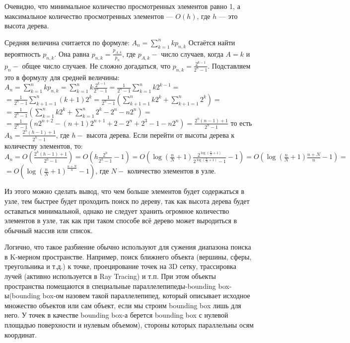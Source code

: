 \documentclass[a4paper, 12pt]{article}
\begin{document}
	Очевидно, что минимальное количество просмотренных элементов равно 1, а максимальное количество просмотренных элементов — $O(h)$, где $h$ — это высота дерева.

	Средняя величина считается по формуле: $A_{n}=\sum_{k=1}^{n} k p_{n, k}$
	Остаётся найти вероятность $p_{n, k}$. Она равна $p_{n, k}=\frac{p_{A, k}}{p_{n}}$, где $p_{A, k}-$ число случаев, когда $A=k$ и $p_{n}-$ общее число случаев. Не сложно догадаться, что $p_{n, k}=\frac{2^{k-1}}{2^{n}-1}$.
	Подставляем это в формулу для средней величины:
	$A_{n}=\sum_{k=1}^{n} k p_{n, k}=\sum_{k=1}^{n} k \frac{2^{k-1}}{2^{n}-1}=\frac{1}{2^{n}-1} \sum_{k=1}^{n} k 2^{k-1}=$
	$=\frac{1}{2^{n}-1} \sum_{k+1=1}^{n}(k+1) 2^{k}=\frac{1}{2^{n}-1}\left(\sum_{k+1=1}^{n} k 2^{k}+\sum_{k+1=1}^{n} 2^{k}\right)=$
	$=\frac{1}{2^{n}-1}\left(\sum_{k=1}^{n} k 2^{k}+\sum_{k=1}^{n} 2^{k}-2^{n}-n 2^{n}\right)=$
	$=\frac{1}{2^{n}-1}\left(n 2^{n+2}-(n+1) 2^{n+1}+2-2^{n}+2^{3}-1-n 2^{n}\right)=\frac{2^{n}(n-1)+1}{2^{n}-1}$
	то есть $A_{h}=\frac{2^{h}(h-1)+1}{2^{h}-1}$, где $h-$ высота дерева.
	Если перейти от высоты дерева к количеству элементов, то: $A_{n}=O\left(\frac{2^{h}(h-1)+1}{2^{h}-1}\right)=O\left(h \frac{2^{h}}{2^{h}-1}-1\right)=O\left(\log \left(\frac{n}{N}+1\right) \frac{2^{\log \left(\frac{n}{N}+1\right)}}{2^{\log \left(\frac{n}{N}+1\right)}-1}-1\right)=O\left(\log \left(\frac{n}{N}+1\right) \frac{n+N}{n}-1\right)=$
	$=O\left(\log \left(\frac{n}{N}+1\right)^{\frac{n+N}{n}}-1\right)$, где $N-$ количество элементов в узле.
	
	Из этого можно сделать вывод, что чем больше элементов будет содержаться в узле, тем быстрее будет проходить поиск по дереву, так как высота дерева будет оставаться минимальной, однако не следует хранить огромное количество элементов в узле, так как при таком способе всё дерево может выродиться в обычный массив или список.

	Логично, что такое разбиение обычно используют для сужения диапазона поиска в K-мерном пространстве. Например, поиск ближнего объекта (вершины, сферы, треугольника и т.д.) к точке, проецирование точек на 3D сетку, трассировка лучей (активно используется в Ray Tracing) и т.п. При этом объекты пространства помещаются в специальные параллелепипеды-bounding box-ы(bounding box-ом назовем такой параллелепипед, который описывает исходное множество объектов или сам объект, если мы строим bounding box лишь для него. У точек в качестве bounding box-а берется bounding box с нулевой площадью поверхности и нулевым объемом), стороны которых параллельны осям координат.
\end{document}
